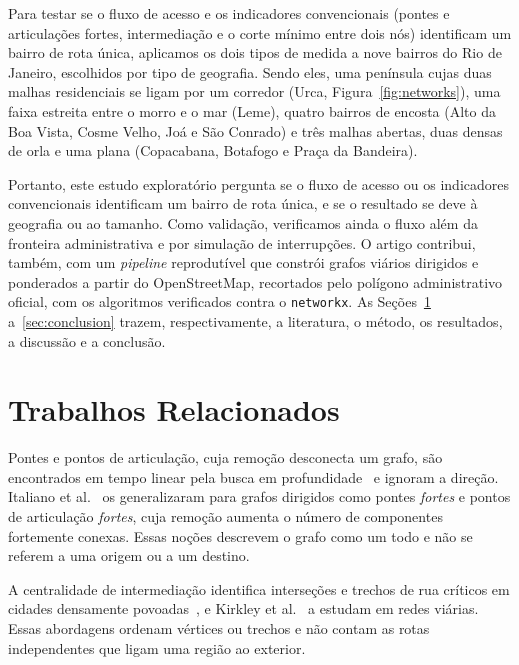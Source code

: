 Para testar se o fluxo de acesso e os indicadores convencionais (pontes e
articulações fortes, intermediação e o corte mínimo entre dois nós)
identificam um bairro de rota única, aplicamos os dois tipos de medida a nove
bairros do Rio de Janeiro, escolhidos por tipo de geografia. Sendo eles, uma península
cujas duas malhas residenciais se ligam por um corredor (Urca,
Figura~\ref{fig:networks}), uma faixa estreita entre o morro e o mar (Leme),
quatro bairros de encosta (Alto da Boa Vista, Cosme Velho, Joá e São Conrado)
e três malhas abertas, duas densas de orla e uma plana (Copacabana, Botafogo e
Praça da Bandeira).

Portanto, este estudo exploratório pergunta se o fluxo de acesso ou os
indicadores convencionais identificam um bairro de rota única, e se o resultado
se deve à geografia ou ao tamanho. Como validação, verificamos ainda o fluxo
além da fronteira administrativa e por simulação de interrupções. O artigo
contribui, também, com um \emph{pipeline} reprodutível que constrói grafos
viários dirigidos e ponderados a partir do OpenStreetMap, recortados pelo
polígono administrativo oficial, com os algoritmos verificados contra o
\texttt{networkx}. As Seções~\ref{sec:related} a~\ref{sec:conclusion} trazem,
respectivamente, a literatura, o método, os resultados, a discussão e a
conclusão.

\section{Trabalhos Relacionados}
\label{sec:related}

Pontes e pontos de articulação, cuja remoção desconecta um grafo, são
encontrados em tempo linear pela busca em profundidade~\cite{tarjan1972depth}
e ignoram a direção. Italiano et al.~\cite{italiano2012finding} os
generalizaram para grafos dirigidos como pontes \emph{fortes} e pontos de
articulação \emph{fortes}, cuja remoção aumenta o número de componentes
fortemente conexas. Essas noções descrevem o grafo como um todo e não se
referem a uma origem ou a um destino.

A centralidade de intermediação identifica interseções e trechos de rua
críticos em cidades densamente povoadas~\cite{alatristasalas2019}, e
Kirkley et al.~\cite{kirkley2018betweenness} a estudam em redes viárias.
Essas abordagens ordenam vértices ou trechos e não contam as rotas
independentes que ligam uma região ao exterior.

